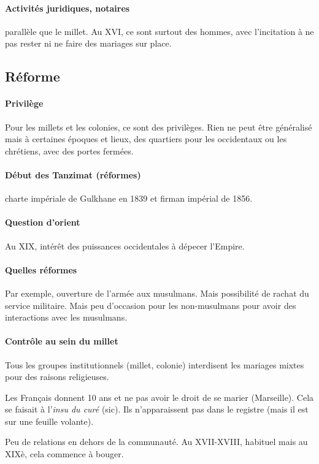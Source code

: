 \paragraph{Activités juridiques, notaires} parallèle que le millet. Au XVI, ce sont surtout des hommes, avec l'incitation à ne pas rester ni ne faire des mariages sur place.

\subsection{Réforme}
\paragraph{Privilège} Pour les millets et les colonies, ce sont des privilèges. Rien ne peut être généralisé mais à certaines époques et lieux, des quartiers pour les occidentaux ou les chrétiens, avec des portes fermées.

\paragraph{Début des Tanzimat (réformes)} charte impériale de Gulkhane en 1839 et firman impérial de 1856. 

\paragraph{Question d'orient} Au XIX, intérêt des puissances occidentales à dépecer l'Empire.

\paragraph{Quelles réformes} Par exemple, ouverture de l'armée aux musulmans. Mais possibilité de rachat du service militaire. Mais peu d'occasion pour les non-musulmans pour avoir des interactions avec les musulmans. 

\paragraph{Contrôle au sein du millet} Tous les groupes institutionnels (millet, colonie) interdisent les mariages mixtes pour des raisons religieuses. 
\begin{Ex}
Les Français donnent 10 ans et ne pas avoir le droit de se marier (Marseille).
Cela se faisait à l'\textit{insu du curé} (sic). Ils n'apparaissent pas dans le registre (mais il est sur une feuille volante). 

\end{Ex}
Peu de relations en dehors de la communauté. Au XVII-XVIII, habituel mais au XIXè, cela commence à bouger. 
